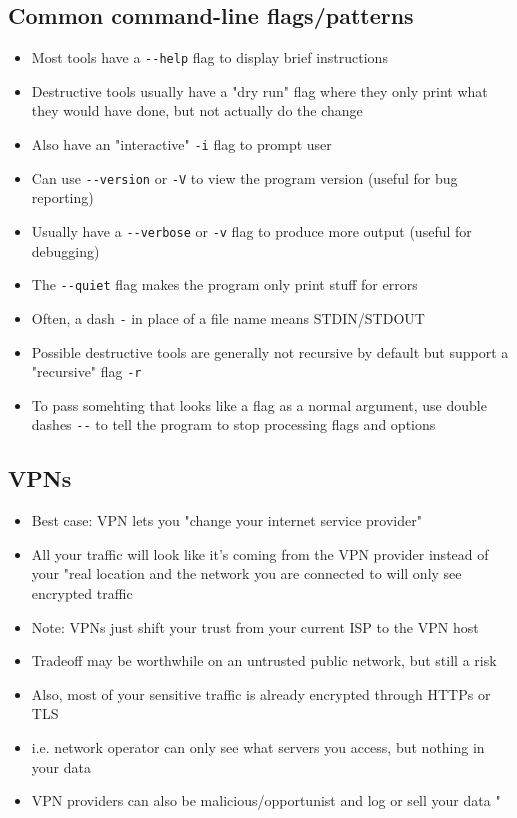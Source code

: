 \documentclass[letterpaper,12pt]{article}
\begin{document}
\subsection{Common command-line flags/patterns}
\begin{itemize}
 \item Most tools have a \lstinline{--help} flag to display brief instructions
 \item Destructive tools usually have a "dry run" flag where they only print what they would have done, but not actually do the change
 \item Also have an "interactive" \lstinline{-i} flag to prompt user
 \item Can use \lstinline{--version} or \lstinline{-V} to view the program version (useful for bug reporting)
 \item Usually have a \lstinline{--verbose} or \lstinline{-v} flag to produce more output (useful for debugging)
 \item The \lstinline{--quiet} flag makes the program only print stuff for errors
 \item Often, a dash \lstinline{-} in place of a file name means STDIN/STDOUT
 \item Possible destructive tools are generally not recursive by default but support a "recursive" flag \lstinline{-r}
 \item To pass somehting that looks like a flag as a normal argument, use double dashes \lstinline{--} to tell the program to stop processing flags and options
\end{itemize}

\subsection{VPNs}
\begin{itemize}
 \item Best case: VPN lets you "change your internet service provider"
 \item All your traffic will look like it's coming from the VPN provider instead of your "real location and the network you are connected to will only see encrypted traffic
 \item Note: VPNs just shift your trust from your current ISP to the VPN host
 \item Tradeoff may be worthwhile on an untrusted public network, but still a risk
 \item Also, most of your sensitive traffic is already encrypted through HTTPs or TLS
 \item i.e. network operator can only see what servers you access, but nothing in your data
 \item VPN providers can also be malicious/opportunist and log or sell your data
       "\end{itemize}
\end{document}
